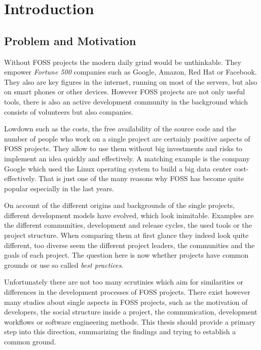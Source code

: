 \chapter{Introduction} %
\label{chap:introduction}

\section{Problem and Motivation} %

Without \ac{FOSS} projects the modern daily grind would be unthinkable. They
empower \emph{Fortune 500} companies such as Google, Amazon, Red Hat or
Facebook. They also are key figures in the internet, running on most of the
servers, but also on smart phones or other devices. However \ac{FOSS} projects
are not only useful tools, there is also an active development community in the
background which consists of volunteers but also companies.

Lowdown such as the costs, the free availability of the source code and the
number of people who work on a single project are certainly positive aspects of
\ac{FOSS} projects. They allow to use them without big investments and risks to
implement an idea quickly and effectively. A matching example is the company
Google which used the Linux operating system to build a big data center
cost-effectively. That is just one of the many reasons why \ac{FOSS} has become
quite popular especially in the last years.

On account of the different origins and backgrounds of the single projects,
different development models have evolved, which look inimitable. Examples are
the different communities, development and release cycles, the used tools or
the project structure. When comparing them at first glance they indeed look
quite different, too diverse seem the different project leaders, the
communities and the goals of each project. The question here is now whether
projects have common grounds or use so called \emph{best practices}.

Unfortunately there are not too many scrutinies which aim for similarities or
differences in the development processes of \ac{FOSS} projects. There exist
however many studies about single aspects in \ac{FOSS} projects, such as the
motivation of developers, the social structure inside a project, the
communication, development workflows or software engineering methods. This
thesis should provide a primary step into this direction, summarizing the
findings and trying to establish a common ground.

